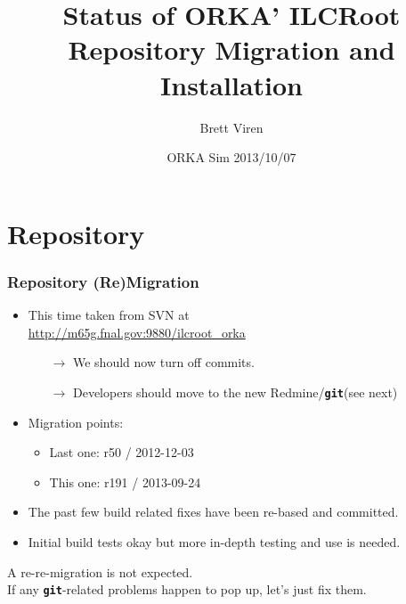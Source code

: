 \documentclass[xcolor=dvipsnames]{beamer}
\author[Brett Viren]{Brett Viren}
\title[ILCRoot]{Status of ORKA' ILCRoot \\ Repository Migration and Installation}
\date{ORKA Sim 2013/10/07}
\newcommand{\git}{\texttt{\textbf{git}}\xspace}
\begin{document}


\begin{frame}
  \titlepage
\end{frame}

\section{Repository}

\begin{frame}
  \frametitle{Repository (Re)Migration}

  \begin{itemize}
  \item This time taken from SVN at\\
    \url{http://m65g.fnal.gov:9880/ilcroot_orka}
    \begin{itemize}
    \item[$\rightarrow$] We should now turn off commits.
    \item[$\rightarrow$] Developers should move to the new Redmine/\git (see next)
    \end{itemize}
  \item Migration points:
    \begin{itemize}
    \item Last one: r50 / 2012-12-03
    \item This one: r191 / 2013-09-24
    \end{itemize}
  \item The past few build related fixes have been re-based and committed.
  \item Initial build tests okay but more in-depth testing and use is needed.
  \end{itemize}

  A re-re-migration is not expected.  \\
  If any \git-related problems
  happen to pop up, let's just fix them.

\end{frame}
\end{document}
